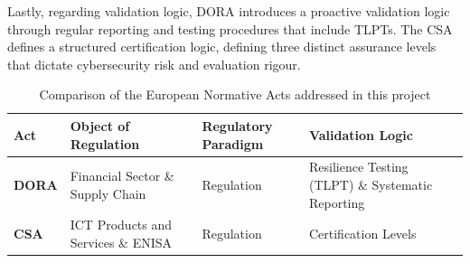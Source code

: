 Lastly, regarding validation logic, \ac{DORA} introduces a proactive validation logic through regular reporting and testing procedures that include \ac{TLPT}s. The \ac{CSA} defines a structured certification logic, defining three distinct assurance levels that dictate cybersecurity risk and evaluation rigour.


\begin{table}[ht]
    \centering
    \renewcommand{\arraystretch}{1.8} %
    \begin{tabularx}{\textwidth}{l X X X}
        \hline
        \textbf{Act} & \textbf{Object of Regulation} & \textbf{Regulatory Paradigm} & \textbf{Validation Logic} \\
        \hline
        \textbf{DORA}   & Financial Sector \& Supply Chain & Regulation & Resilience Testing (\ac{TLPT}) \& Systematic Reporting \\
        \textbf{CSA}    & \ac{ICT} Products and Services \& \ac{ENISA} & Regulation & Certification Levels \\
        \hline
    \end{tabularx}
    \caption{Comparison of the European Normative Acts addressed in this project}
    \label{tab:normative_acts_comparison}
\end{table}
\fi